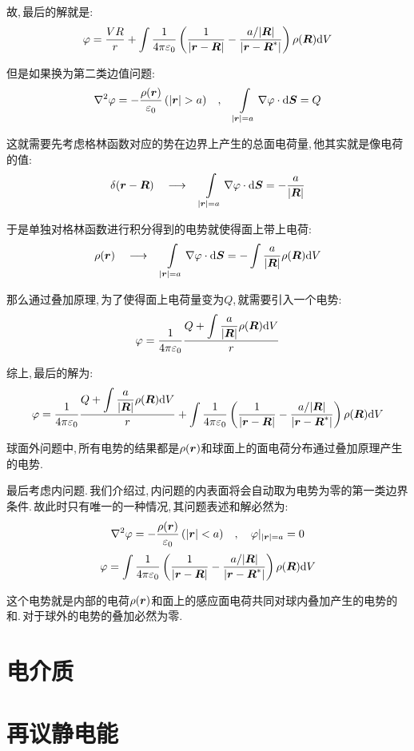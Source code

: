 故,\,最后的解就是:
\[\varphi=\frac{VR}{r}+\int \frac{1}{4\pi\varepsilon_0} \left(\frac{1}{|\boldsymbol{r}-\boldsymbol{R}|}-\frac{a/|\boldsymbol{R}|}{|\boldsymbol{r}-\boldsymbol{R}^\ast|}\right)\rho(\boldsymbol{R})\textrm{d} V\]

但是如果换为第二类边值问题:
\[\nabla^2\varphi = -\frac{\rho(\bs{r})}{\varepsilon_0}\,(|\bs{r}|>a)\quad ,\quad \int\limits_{|\bs{r}|=a}\nabla\varphi\cdot \ud \bs{S}=Q\]

这就需要先考虑格林函数对应的势在边界上产生的总面电荷量,\,他其实就是像电荷的值:
\[\delta(\boldsymbol{r}-\boldsymbol{R})\quad \longrightarrow\quad  \int\limits_{|\boldsymbol{r}|=a}\nabla\varphi\cdot \textrm{d} \boldsymbol{S}=-\frac{a}{|\boldsymbol{R}|}\]

于是单独对格林函数进行积分得到的电势就使得面上带上电荷:
\[\rho(\boldsymbol{r})\quad \longrightarrow\quad \int\limits_{|\boldsymbol{r}|=a}\nabla\varphi\cdot \textrm{d} \boldsymbol{S}=-\int \frac{a}{|\boldsymbol{R}|}\rho(\boldsymbol{R})\textrm{d} V\]

那么通过叠加原理,\,为了使得面上电荷量变为$Q$,\,就需要引入一个电势:
\[\varphi=\frac{1}{4\pi\varepsilon_0} \frac{Q+\displaystyle\int \frac{a}{|\boldsymbol{R}|}\rho(\boldsymbol{R})\textrm{d} V}{r}\]

综上,\,最后的解为:
\[\varphi =\frac{1}{4\pi\varepsilon_0} \frac{Q+\displaystyle\int \frac{a}{|\boldsymbol{R}|}\rho(\boldsymbol{R})\textrm{d} V}{r}+\int \frac{1}{4\pi\varepsilon_0} \left(\frac{1}{|\boldsymbol{r}-\boldsymbol{R}|}-\frac{a/|\boldsymbol{R}|}{|\boldsymbol{r}-\boldsymbol{R}^\ast|}\right)\rho(\boldsymbol{R})\textrm{d} V \]

球面外问题中,\,所有电势的结果都是$\rho(\boldsymbol{r})$和球面上的面电荷分布通过叠加原理产生的电势.

最后考虑内问题.\,我们介绍过,\,内问题的内表面将会自动取为电势为零的第一类边界条件.\,故此时只有唯一的一种情况,\,其问题表述和解必然为:
\[\nabla^2\varphi = -\frac{\rho(\boldsymbol{r})}{\varepsilon_0}\,(|\boldsymbol{r}|<a)\quad ,\quad \varphi|_{|\boldsymbol{r}|=a}=0\]
\[\varphi=\int \frac{1}{4\pi\varepsilon_0} \left(\frac{1}{|\boldsymbol{r}-\boldsymbol{R}|}-\frac{a/|\boldsymbol{R}|}{|\boldsymbol{r}-\boldsymbol{R}^\ast|}\right)\rho(\boldsymbol{R})\textrm{d} V\]

这个电势就是内部的电荷$\rho(\boldsymbol{r})$和面上的感应面电荷共同对球内叠加产生的电势的和.\,对于球外的电势的叠加必然为零.


\section{电介质}

\section{再议静电能}
